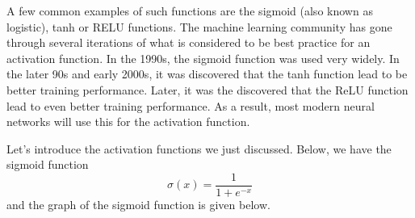 \documentclass[12pt,letterpaper]{book}
\theoremstyle{definition}
\begin{document}
  A few common examples of such functions are the sigmoid (also known as logistic), tanh or RELU functions.
  The machine learning community has gone through several iterations of what is considered to be 
  best practice for an activation function. In the 1990s, the sigmoid function was used very widely.
  In the later 90s and early 2000s, it was discovered that the tanh function lead to be better 
  training performance. Later, it was the discovered that the ReLU function lead to even better 
  training performance. As a result, most modern neural networks will use this for the 
  activation function. 

  Let's introduce the activation functions we just discussed. Below, we have 
  the sigmoid function
  \[
      \sigma(x) = \frac{1}{1 + e^{-x}}
  \]
  and the graph of the sigmoid function is given below.
  \begin{center}
\end{center}
\end{document}
